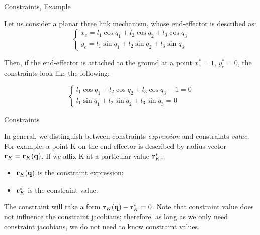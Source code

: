 \documentclass{beamer}
\begin{document}
\begin{frame}{Constraints, Example}
	\begin{flushleft}
		
		Let us consider a planar three link mechanism, whose end-effector is described as:
		\begin{equation}
			\begin{cases}
				 x_e = l_1 \cos q_1 + l_2 \cos q_2 + l_3 \cos q_3 
				 \\
				 y_e = l_1 \sin q_1 + l_2 \sin q_2 + l_3 \sin q_3 
			\end{cases}
		\end{equation}
		
		Then, if the end-effector is attached to the ground at a point $x_e^* = 1$, $y_e^* = 0$, the constraints look like the following:
		
		\begin{equation}
	\begin{cases}
		l_1 \cos q_1 + l_2 \cos q_2 + l_3 \cos q_3 - 1 = 0
		\\
		l_1 \sin q_1 + l_2 \sin q_2 + l_3 \sin q_3 = 0
	\end{cases}
\end{equation}
		
		
	\end{flushleft}
\end{frame}



\begin{frame}{Constraints}
	\begin{flushleft}
		
				In general, we distinguish between constraints \emph{expression} and constraints \emph{value}. For example, a point K on the end-effector is described by radius-vector $\mathbf{r}_K=\mathbf{r}_K(\mathbf{q})$. If we affix K at a particular value $\mathbf{r}_K^*$:
				
				\begin{itemize}
					\item $\mathbf{r}_K(\mathbf{q})$ is the constraint expression;
					
					\item  $\mathbf{r}_K^*$ is the constraint value.
				\end{itemize}
			
			\bigskip
			
			The constraint will take a form $\mathbf{r}_K(\mathbf{q}) - \mathbf{r}_K^* = 0$. Note that constraint value does not influence the constraint jacobians; therefore, as long as we only need constraint jacobians, we do not need to know constraint values.
		
	\end{flushleft}
\end{frame}
\end{document}
